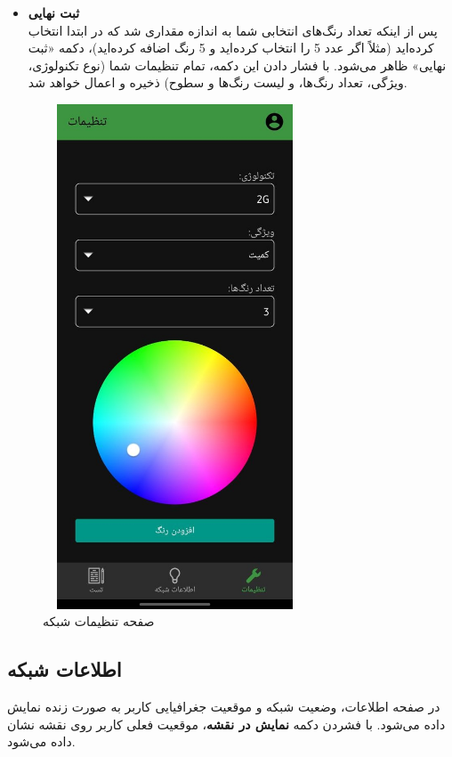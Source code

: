 \documentclass{report}
\begin{document}
\begin{itemize}
	\item \textbf{ثبت نهایی} \\
	پس از اینکه تعداد رنگ‌های انتخابی شما به اندازه مقداری شد که در ابتدا انتخاب کرده‌اید (مثلاً اگر عدد 5 را انتخاب کرده‌اید و 5 رنگ اضافه کرده‌اید)، دکمه «ثبت نهایی» ظاهر می‌شود. با فشار دادن این دکمه، تمام تنظیمات شما (نوع تکنولوژی، ویژگی، تعداد رنگ‌ها، و لیست رنگ‌ها و سطوح) ذخیره و اعمال خواهد شد.
	
\end{itemize}

\begin{figure}[ht]
	\centering
	\includegraphics[width=0.7\textwidth,height=15cm,keepaspectratio]{Pic/setting}
	\caption{صفحه تنظیمات شبکه}
	\label{fig:setting}
\end{figure}

\subsection{اطلاعات شبکه}

در صفحه اطلاعات، وضعیت شبکه و موقعیت جغرافیایی کاربر به صورت زنده نمایش داده می‌شود.  
با فشردن دکمه \textbf{نمایش در نقشه}، موقعیت فعلی کاربر روی نقشه نشان داده می‌شود.
\end{document}

